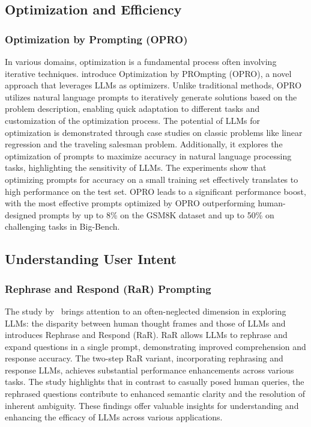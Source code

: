 \documentclass{article}
\begin{document}
\subsection{Optimization and Efficiency}
\label{oe}
\subsubsection{Optimization by Prompting (OPRO)}
\label{opro}
In various domains, optimization is a fundamental process often involving iterative techniques. \cite{yang2023large} introduce Optimization by PROmpting (OPRO), a novel approach that leverages LLMs as optimizers. Unlike traditional methods, OPRO utilizes natural language prompts to iteratively generate solutions based on the problem description, enabling quick adaptation to different tasks and customization of the optimization process. The potential of LLMs for optimization is demonstrated through case studies on classic problems like linear regression and the traveling salesman problem. Additionally, it explores the optimization of prompts to maximize accuracy in natural language processing tasks, highlighting the sensitivity of LLMs. The experiments show that optimizing prompts for accuracy on a small training set effectively translates to high performance on the test set. OPRO leads to a significant performance boost, with the most effective prompts optimized by OPRO outperforming human-designed prompts by up to 8\% on the GSM8K dataset and up to 50\% on challenging tasks in Big-Bench.

\subsection{Understanding User Intent}
\label{uui}
\subsubsection{Rephrase and Respond (RaR) Prompting}
\label{RaR}
The study by~\cite{deng2023rephrase} brings attention to an often-neglected dimension in exploring LLMs: the disparity between human thought frames and those of LLMs and introduces Rephrase and Respond (RaR). RaR allows LLMs to rephrase and expand questions in a single prompt, demonstrating improved comprehension and response accuracy. The two-step RaR variant, incorporating rephrasing and response LLMs, achieves substantial performance enhancements across various tasks. The study highlights that in contrast to casually posed human queries, the rephrased questions contribute to enhanced semantic clarity and the resolution of inherent ambiguity. These findings offer valuable insights for understanding and enhancing the efficacy of LLMs across various applications.
\end{document}
